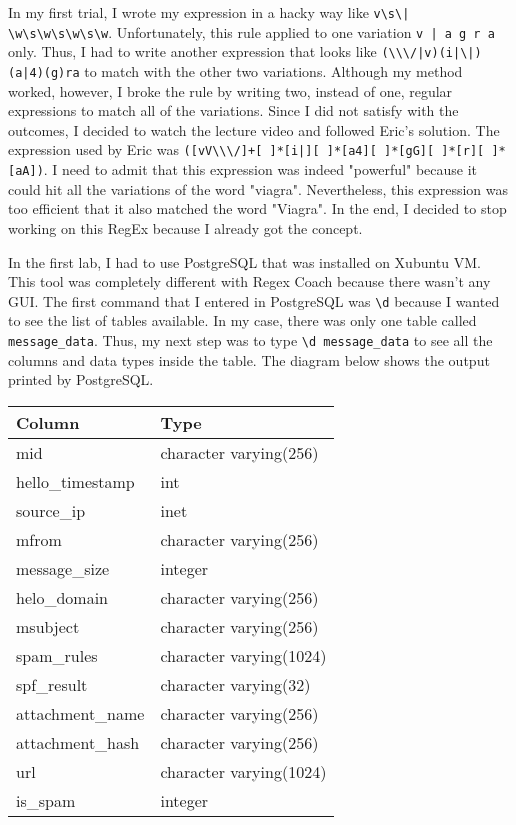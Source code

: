 \documentclass[letterpaper,10pt,titlepage,draftclsnofoot,onecolumn]{IEEEtran}
\begin{document}
In my first trial, I wrote my expression in a hacky way like \verb=v\s\| \w\s\w\s\w\s\w=.
Unfortunately, this rule applied to one variation \verb=v | a g r a= only.
Thus, I had to write another expression that looks like \verb=(\\\/|v)(i|\|)(a|4)(g)ra= to match with the other two variations.
Although my method worked, however, I broke the rule by writing two, instead of one, regular expressions to match all of the variations.
Since I did not satisfy with the outcomes, I decided to watch the lecture video and followed Eric's solution.
The expression used by Eric was \verb=([vV\\\/]+[ ]*[i|][ ]*[a4][ ]*[gG][ ]*[r][ ]*[aA])=.
I need to admit that this expression was indeed "powerful" because it could hit all the variations of the word "viagra". 
Nevertheless, this expression was too efficient that it also matched the word "Viagra". 
In the end, I decided to stop working on this RegEx because I already got the concept.

In the first lab, I had to use PostgreSQL that was installed on Xubuntu VM.
This tool was completely different with Regex Coach because there wasn't any GUI.
The first command that I entered in PostgreSQL was \verb|\d| because I wanted to see the list of tables available.
In my case, there was only one table called \verb|message_data|.
Thus, my next step was to type \verb|\d message_data| to see all the columns and data types inside the table.
The diagram below shows the output printed by PostgreSQL.

\begin{center}
\begin{tabular}{ |p{3cm}|p{5cm}|  }
 \hline
 Column & Type\\
 \hline 
			mid					& character varying(256)\\
			hello\_timestamp		& int\\
			source\_ip			& inet\\
			mfrom				& character varying(256)\\
			message\_size		& integer\\
			helo\_domain			& character varying(256)\\
			msubject			& character varying(256)\\
			spam\_rules			& character varying(1024)\\
			spf\_result			& character varying(32)\\
			attachment\_name		& character varying(256)\\
			attachment\_hash		& character varying(256)\\
			url					& character varying(1024)\\
			is\_spam				& integer\\

 \hline
\end{tabular}
\end{center}
\end{document}
